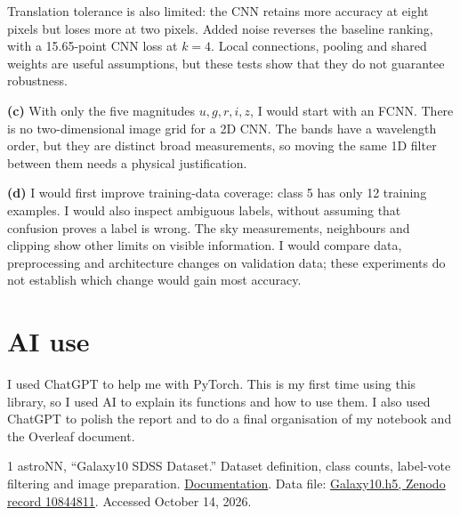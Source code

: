 \documentclass[11pt]{article}
\begin{document}
Translation tolerance is also limited: the CNN retains more accuracy at eight pixels but loses more at two pixels. Added noise reverses the baseline ranking, with a 15.65-point CNN loss at $k=4$. Local connections, pooling and shared weights are useful assumptions, but these tests show that they do not guarantee robustness.

\textbf{(c)} With only the five magnitudes $u,g,r,i,z$, I would start with an FCNN. There is no two-dimensional image grid for a 2D CNN. The bands have a wavelength order, but they are distinct broad measurements, so moving the same 1D filter between them needs a physical justification.

\textbf{(d)} I would first improve training-data coverage: class 5 has only 12 training examples. I would also inspect ambiguous labels, without assuming that confusion proves a label is wrong. The sky measurements, neighbours and clipping show other limits on visible information. I would compare data, preprocessing and architecture changes on validation data; these experiments do not establish which change would gain most accuracy.


\section*{AI use}
I used ChatGPT to help me with PyTorch. This is my first time using this library, so I used AI to explain its functions and how to use them. I also used ChatGPT to polish the report and to do a final organisation of my notebook and the Overleaf document.

\begin{thebibliography}{1}
astroNN, ``Galaxy10 SDSS Dataset.'' Dataset definition, class counts, label-vote filtering and image preparation. \href{https://astronn.readthedocs.io/en/latest/galaxy10sdss.html}{Documentation}. Data file: \href{https://zenodo.org/records/10844811/files/Galaxy10.h5}{Galaxy10.h5, Zenodo record 10844811}. Accessed October 14, 2026.

\end{thebibliography}
\end{document}
